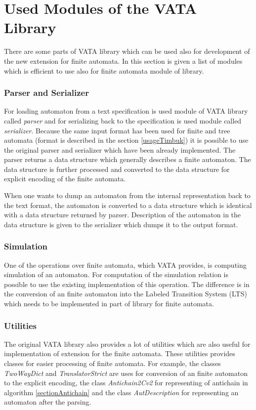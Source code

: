 \section{Used Modules of the VATA Library}
There are some parts of VATA library which can be used also for development of the new extension for finite automata. In this section is given a list of modules
which is efficient to use also for finite automata module of library.

\subsubsection{Parser and Serializer}
For loading automaton from a text specification is used module of VATA library called \emph{parser} and for serializing back to the specification is used
module called \emph{serializer}. Because the same input format has been used for finite and tree automata (format is described in the section \ref{usageTimbuk})
it is possible to use the original parser and serializer which have been already implemented. 
The parser returns a data structure which generally describes a finite automaton. The data structure is further processed and converted 
to the data structure for explicit encoding of the finite automata. 

When one wants to dump an automaton from the internal representation back to the text format, 
the automaton is converted to a data structure which is identical with a data structure returned by parser. Description of the automaton in the
data structure is given to the serializer which dumps it to the output format.

\subsubsection{Simulation}
One of the operations over finite automata, which VATA provides, is computing simulation of an automaton. For computation of the simulation relation
is possible to use the existing implementation of this operation. 
The difference is in the conversion of an finite automaton into the Labeled Transition System (LTS) which
needs to be implemented in part of library for finite automata.

\subsubsection{Utilities}
The original VATA library also provides a lot of utilities which are also useful for implementation of extension for the finite automata. These utilities
provides classes for easier processing of finite automata. For example, the classes \emph{TwoWayDict} and \emph{TranslatorStrict} are uses for conversion
of an finite automaton to the explicit encoding, the class \emph{Antichain2Cv2} for representing of antichain in algorithm \ref{sectionAntichain} 
and the class \emph{AutDescription} for representing an automaton after the parsing.

